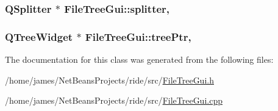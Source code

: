 \hypertarget{class_file_tree_gui_a43e8677ba8c50059d003f298b631e131}{
\subsubsection[{splitter}]{\setlength{\rightskip}{0pt plus 5cm}Q\-Splitter $\ast$ File\-Tree\-Gui\-::splitter\hspace{0.3cm}{\ttfamily [static]}, {\ttfamily [private]}}}\label{class_file_tree_gui_a43e8677ba8c50059d003f298b631e131}
\hypertarget{class_file_tree_gui_a46dee8099b8a67b854a57a761528b493}{
\subsubsection[{tree\-Ptr}]{\setlength{\rightskip}{0pt plus 5cm}Q\-Tree\-Widget $\ast$ File\-Tree\-Gui\-::tree\-Ptr\hspace{0.3cm}{\ttfamily [static]}, {\ttfamily [private]}}}\label{class_file_tree_gui_a46dee8099b8a67b854a57a761528b493}


The documentation for this class was generated from the following files\-:\begin{DoxyCompactItemize}
\item 
/home/james/\-Net\-Beans\-Projects/ride/src/\hyperlink{_file_tree_gui_8h}{File\-Tree\-Gui.\-h}\item 
/home/james/\-Net\-Beans\-Projects/ride/src/\hyperlink{_file_tree_gui_8cpp}{File\-Tree\-Gui.\-cpp}\end{DoxyCompactItemize}
